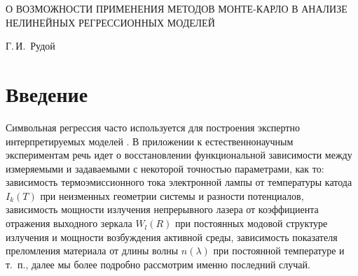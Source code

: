 \documentclass[11pt,a4paper]{article}
\theoremstyle{definition}
\begin{document}
\begin{center}
  О ВОЗМОЖНОСТИ ПРИМЕНЕНИЯ МЕТОДОВ МОНТЕ-КАРЛО В АНАЛИЗЕ НЕЛИНЕЙНЫХ РЕГРЕССИОННЫХ МОДЕЛЕЙ

  \bigskip
  Г.\,И.~Рудой
\end{center}

\section*{Введение}

Символьная регрессия часто используется для построения экспертно
интерпретируемых моделей
\cite{davidson:2000:snrea,reference/ml/X10vc,StrijovW10,Strijov08InductMethods,Rudoy13}.
В приложении к естественнонаучным
экспериментам речь идет о восстановлении функциональной зависимости
между измеряемыми и задаваемыми с некоторой точностью параметрами,
как то: зависимость термоэмиссионного тока
электронной лампы от температуры катода $I_k(T)$ при неизменных геометрии
системы и разности потенциалов, зависимость мощности излучения
непрерывного лазера от коэффициента отражения выходного зеркала $W_l(R)$
при постоянных модовой структуре излучения и мощности возбуждения
активной среды, зависимость показателя преломления материала от длины
волны $n(\lambda)$ при постоянной температуре и т.~п., далее мы более подробно
рассмотрим именно последний случай.
\end{document}
